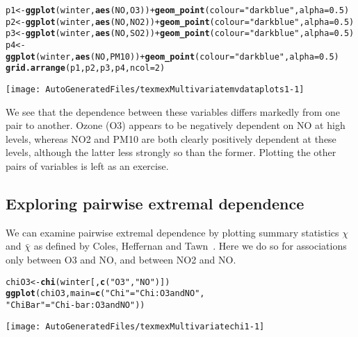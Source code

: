 \documentclass[10pt]{article}\usepackage[]{graphicx}\usepackage[]{color}
\makeatletter
\def\maxwidth{ %
  \ifdim\Gin@nat@width>\linewidth
    \linewidth
  \else
    \Gin@nat@width
  \fi
}
\newcommand{\hlnum}[1]{\textcolor[rgb]{0.686,0.059,0.569}{#1}}%
\newcommand{\hlstr}[1]{\textcolor[rgb]{0.192,0.494,0.8}{#1}}%
\newcommand{\hlopt}[1]{\textcolor[rgb]{0,0,0}{#1}}%
\newcommand{\hlstd}[1]{\textcolor[rgb]{0.345,0.345,0.345}{#1}}%
\newcommand{\hlkwb}[1]{\textcolor[rgb]{0.69,0.353,0.396}{#1}}%
\newcommand{\hlkwc}[1]{\textcolor[rgb]{0.333,0.667,0.333}{#1}}%
\newcommand{\hlkwd}[1]{\textcolor[rgb]{0.737,0.353,0.396}{\textbf{#1}}}%
\newenvironment{kframe}{%
 \def\at@end@of@kframe{}%
 \ifinner\ifhmode%
  \def\at@end@of@kframe{\end{minipage}}%
  \begin{minipage}{\columnwidth}%
 \fi\fi%
 \def\FrameCommand##1{\hskip\@totalleftmargin \hskip-\fboxsep
 \colorbox{shadecolor}{##1}\hskip-\fboxsep
     \hskip-\linewidth \hskip-\@totalleftmargin \hskip\columnwidth}%
 \MakeFramed {\advance\hsize-\width
   \@totalleftmargin\z@ \linewidth\hsize
   \@setminipage}}%
 {\par\unskip\endMakeFramed%
 \at@end@of@kframe}
\newenvironment{knitrout}{}{} %
\makeatother
\begin{document}
\begin{knitrout}
\color{fgcolor}\begin{kframe}
\begin{alltt}
\hlstd{p1} \hlkwb{<-} \hlkwd{ggplot}\hlstd{(winter,}\hlkwd{aes}\hlstd{(NO,O3))} \hlopt{+} \hlkwd{geom_point}\hlstd{(}\hlkwc{colour}\hlstd{=}\hlstr{"darkblue"}\hlstd{,}\hlkwc{alpha}\hlstd{=}\hlnum{0.5}\hlstd{)}
\hlstd{p2} \hlkwb{<-} \hlkwd{ggplot}\hlstd{(winter,}\hlkwd{aes}\hlstd{(NO,NO2))} \hlopt{+} \hlkwd{geom_point}\hlstd{(}\hlkwc{colour}\hlstd{=}\hlstr{"darkblue"}\hlstd{,}\hlkwc{alpha}\hlstd{=}\hlnum{0.5}\hlstd{)}
\hlstd{p3} \hlkwb{<-} \hlkwd{ggplot}\hlstd{(winter,}\hlkwd{aes}\hlstd{(NO,SO2))} \hlopt{+} \hlkwd{geom_point}\hlstd{(}\hlkwc{colour}\hlstd{=}\hlstr{"darkblue"}\hlstd{,}\hlkwc{alpha}\hlstd{=}\hlnum{0.5}\hlstd{)}
\hlstd{p4} \hlkwb{<-} \hlkwd{ggplot}\hlstd{(winter,}\hlkwd{aes}\hlstd{(NO,PM10))} \hlopt{+} \hlkwd{geom_point}\hlstd{(}\hlkwc{colour}\hlstd{=}\hlstr{"darkblue"}\hlstd{,}\hlkwc{alpha}\hlstd{=}\hlnum{0.5}\hlstd{)}
\hlkwd{grid.arrange}\hlstd{(p1,p2,p3,p4,}\hlkwc{ncol}\hlstd{=}\hlnum{2}\hlstd{)}
\end{alltt}
\end{kframe}
\texttt{[image: AutoGeneratedFiles/texmexMultivariatemvdataplots1-1]} 

\end{knitrout}
\label{fig:NO.Data}

We see that the dependence between these variables differs markedly from one pair to another.
Ozone (O3) appears to be negatively dependent on NO at high levels, whereas NO2 and PM10 are
both clearly positively dependent at these levels, although the latter less strongly so than
the former.  Plotting the other pairs of variables is left as an exercise.
%
\subsection{Exploring pairwise extremal dependence}
%
We can examine pairwise extremal dependence by plotting summary
statistics $\chi$ and $\bar\chi$ as defined by Coles, Heffernan
and Tawn~\cite{colesHeffernanTawn}. Here we do so for associations only between
O3 and NO, and between NO2 and NO.

\begin{knitrout}
\color{fgcolor}\begin{kframe}
\begin{alltt}
\hlstd{chiO3} \hlkwb{<-} \hlkwd{chi}\hlstd{(winter[,} \hlkwd{c}\hlstd{(}\hlstr{"O3"}\hlstd{,} \hlstr{"NO"}\hlstd{)])}
\hlkwd{ggplot}\hlstd{(chiO3,} \hlkwc{main}\hlstd{=}\hlkwd{c}\hlstd{(}\hlstr{"Chi"}\hlstd{=}\hlstr{"Chi: O3 and NO"}\hlstd{,}
                     \hlstr{"ChiBar"}\hlstd{=}\hlstr{"Chi-bar: O3 and NO"}\hlstd{))}
\end{alltt}
\end{kframe}
\texttt{[image: AutoGeneratedFiles/texmexMultivariatechi1-1]} 

\end{knitrout}
\end{document}
